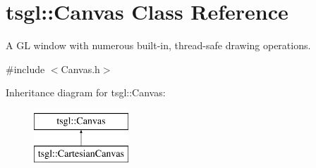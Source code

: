 \hypertarget{classtsgl_1_1_canvas}{\section{tsgl\-:\-:\-Canvas \-Class \-Reference}
\label{classtsgl_1_1_canvas}
}


\-A \-G\-L window with numerous built-\/in, thread-\/safe drawing operations.  




{\ttfamily \#include $<$\-Canvas.\-h$>$}

\-Inheritance diagram for tsgl\-:\-:\-Canvas\-:\begin{figure}[H]
\begin{center}
\leavevmode
\includegraphics[height=2.000000cm]{classtsgl_1_1_canvas}
\end{center}
\end{figure}
